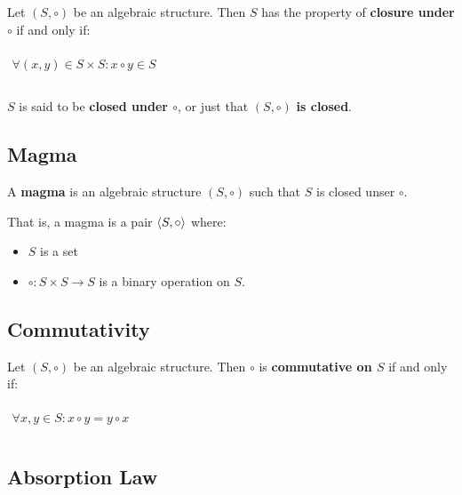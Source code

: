 Let $(S, \circ)$ be an algebraic structure. Then $S$ has the property
of \textbf{closure under $\circ$} if and only if:

\begin{math}
  \begin{array}{c}
    \\
    \forall (x, y) \in S \times S : x \circ y \in S\\
    \\
  \end{array}
\end{math}


$S$ is said to be \textbf{closed under $\circ$}, or just that
$(S, \circ)$ \textbf{is closed}.

\subsection{Magma}
\label{sec:magma}

A \textbf{magma} is an algebraic structure $(S, \circ)$ such that $S$
is closed unser $\circ$.

That is, a magma is a pair $\langle S, \circ \rangle$ where:

\begin{itemize}
\item $S$ is a set
\item $\circ: S \times S \to S $ is a binary operation on $S$.
\end{itemize}




\subsection{Commutativity}
\label{sec:commutativity}

Let $(S, \circ)$ be an algebraic structure. Then $\circ$ is
\textbf{commutative on $S$} if and only if:

\begin{math}
  \begin{array}{c}
    \\
    \forall x, y \in S: x \circ y = y \circ x\\
    \\
  \end{array}
\end{math}

\subsection{Absorption Law}
\label{sec:absorption}

